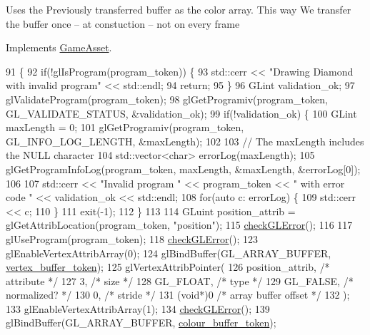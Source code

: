 Uses the Previously transferred buffer as the color array. This way We transfer the buffer once -- at constuction -- not on every frame

Implements \hyperlink{classGameAsset_a961aa51ca0a9961fc584c0b5d5431300}{Game\+Asset}.


\begin{DoxyCode}
91                                             \{
92   \textcolor{keywordflow}{if}(!glIsProgram(program\_token)) \{
93     std::cerr << \textcolor{stringliteral}{"Drawing Diamond with invalid program"} << std::endl;
94     \textcolor{keywordflow}{return};
95   \}
96   GLint validation\_ok;
97   glValidateProgram(program\_token);
98   glGetProgramiv(program\_token, GL\_VALIDATE\_STATUS, &validation\_ok);
99   \textcolor{keywordflow}{if}(!validation\_ok) \{
100     GLint maxLength = 0;
101     glGetProgramiv(program\_token, GL\_INFO\_LOG\_LENGTH, &maxLength);
102 
103     \textcolor{comment}{// The maxLength includes the NULL character}
104     std::vector<char> errorLog(maxLength);
105     glGetProgramInfoLog(program\_token, maxLength, &maxLength, &errorLog[0]);
106 
107     std::cerr << \textcolor{stringliteral}{"Invalid program "} << program\_token << \textcolor{stringliteral}{" with error code "} << validation\_ok << std::endl;
108     \textcolor{keywordflow}{for}(\textcolor{keyword}{auto} c: errorLog) \{
109       std::cerr << c;
110     \}
111     exit(-1);
112   \}
113 
114   GLuint position\_attrib = glGetAttribLocation(program\_token, \textcolor{stringliteral}{"position"});
115   \hyperlink{DiamondAsset_8cc_a75f201b0e53e68726854997957322b8d}{checkGLError}();
116 
117   glUseProgram(program\_token);
118   \hyperlink{DiamondAsset_8cc_a75f201b0e53e68726854997957322b8d}{checkGLError}();
123   glEnableVertexAttribArray(0);
124   glBindBuffer(GL\_ARRAY\_BUFFER, \hyperlink{classDiamondAsset_ac1965c61c0cfd5719c5c01bac98fd312}{vertex\_buffer\_token});
125   glVertexAttribPointer(
126     position\_attrib,        \textcolor{comment}{/* attribute */}
127     3,        \textcolor{comment}{/* size */}
128     GL\_FLOAT,   \textcolor{comment}{/* type */}
129     GL\_FALSE,   \textcolor{comment}{/* normalized? */}
130     0,        \textcolor{comment}{/* stride */}
131     (\textcolor{keywordtype}{void}*)0    \textcolor{comment}{/* array buffer offset */}
132   );
133   glEnableVertexAttribArray(1);
134   \hyperlink{DiamondAsset_8cc_a75f201b0e53e68726854997957322b8d}{checkGLError}();
139   glBindBuffer(GL\_ARRAY\_BUFFER, \hyperlink{classDiamondAsset_a500edbd99d521120d7028f3bf4c24743}{colour\_buffer\_token});

\end{DoxyCode}
